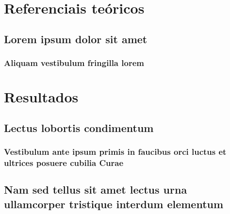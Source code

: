 \documentclass[
	12pt,                   %
	openright,              %
	oneside,                %
	a4paper,                %
	english,                %
	brazil                  %
	]{abntex2}
\begin{document}
  

  \part{Referenciais teóricos}

  \chapter{Lorem ipsum dolor sit amet}

  \section{Aliquam vestibulum fringilla lorem}

  \lipsum[1]

  \lipsum[2-3]

  \part{Resultados}

  \chapter{Lectus lobortis condimentum}

  \section{Vestibulum ante ipsum primis in faucibus orci luctus et ultrices
    posuere cubilia Curae}

  \lipsum[21-22]

  \chapter{Nam sed tellus sit amet lectus urna ullamcorper tristique interdum
    elementum}
\end{document}
